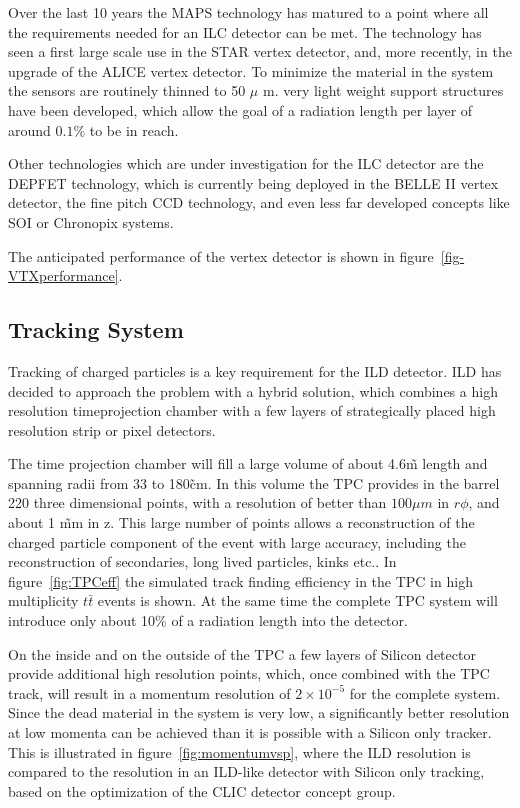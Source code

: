 \documentclass[%
 amsmath,amssymb,
 aps,
]{revtex4-1}
\begin{document}
Over the last 10 years the MAPS technology has matured to a point where all the requirements needed for an ILC detector can be met. The technology has seen a first large scale use in the STAR vertex detector, and, more recently, in the upgrade of the ALICE vertex detector. To minimize the material in the system the sensors are routinely thinned to 50 $\mu$ m. very light weight support structures have been developed, which allow the goal of a radiation length per layer of around $0.1 \%$ to be in reach. 

Other technologies which are under investigation for the ILC detector are the DEPFET technology, which is currently being deployed in the BELLE II vertex detector, the fine pitch CCD technology, and even less far developed concepts like SOI or Chronopix systems. 

The anticipated performance of the vertex detector is shown in figure~\ref{fig-VTXperformance}.  

\subsection{Tracking System}

Tracking of charged particles is a key requirement for the ILD detector. ILD has decided to approach the problem with a hybrid solution, which combines a high resolution timeprojection chamber with a few layers of strategically placed high resolution strip or pixel detectors. 

The time projection chamber will fill a large volume of about 4.6\~m length and spanning radii from 33 to 180\~cm. In this volume the TPC provides in the barrel 220 three dimensional points, with a resolution of better than $100 \mu m$ in $r \phi$, and about 1 \~mm in z. This large number of points allows a reconstruction of the charged particle component of the event with large accuracy, including the reconstruction of secondaries, long lived particles, kinks etc.. In figure~\ref{fig:TPCeff} the simulated track finding efficiency in the TPC in high multiplicity $t \bar t$ events is shown. At the same time the complete TPC system will introduce only about 10\% of a radiation length into the detector. 

On the inside and on the outside of the TPC a few layers of Silicon detector provide additional high resolution points, which, once combined with the TPC track, will result in a momentum resolution of $2 \times 10^{-5}$ for the complete system. Since the dead material in the system is very low, a significantly better resolution at low momenta can be achieved than it is possible with a Silicon only tracker. This is illustrated in figure~\ref{fig:momentumvsp}, where the ILD resolution is compared to the resolution in an ILD-like detector with Silicon only tracking, based on the optimization of the CLIC detector concept group. 
\end{document}

